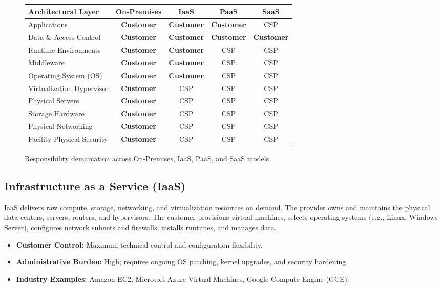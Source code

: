 \begin{figure}[htbp]
\centering
\small
\begin{tcolorbox}[colback=blue!5!white,colframe=blue!75!black,title=\textbf{The Cloud Service Model Abstraction Stack}]
\begin{center}
\setlength{\tabcolsep}{4.5pt}\begin{tabularx}{\linewidth}{|X|c|c|c|c|}
\hline
\textbf{Architectural Layer} & \textbf{On-Premises} & \textbf{IaaS} & \textbf{PaaS} & \textbf{SaaS} \\
\hline
Applications & \textbf{Customer} & \textbf{Customer} & \textbf{Customer} & CSP \\
Data \& Access Control & \textbf{Customer} & \textbf{Customer} & \textbf{Customer} & \textbf{Customer} \\
Runtime Environments & \textbf{Customer} & \textbf{Customer} & CSP & CSP \\
Middleware & \textbf{Customer} & \textbf{Customer} & CSP & CSP \\
Operating System (OS) & \textbf{Customer} & \textbf{Customer} & CSP & CSP \\
Virtualization Hypervisor & \textbf{Customer} & CSP & CSP & CSP \\
Physical Servers & \textbf{Customer} & CSP & CSP & CSP \\
Storage Hardware & \textbf{Customer} & CSP & CSP & CSP \\
Physical Networking & \textbf{Customer} & CSP & CSP & CSP \\
Facility Physical Security & \textbf{Customer} & CSP & CSP & CSP \\
\hline
\end{tabularx}
\end{center}
\end{tcolorbox}
\caption{Responsibility demarcation across On-Premises, IaaS, PaaS, and SaaS models.}
\label{fig:service_model_stack}
\end{figure}

\subsection{Infrastructure as a Service (IaaS)}
IaaS delivers raw compute, storage, networking, and virtualization resources on demand. The provider owns and maintains the physical data centers, servers, routers, and hypervisors. The customer provisions virtual machines, selects operating systems (e.g., Linux, Windows Server), configures network subnets and firewalls, installs runtimes, and manages data.
\begin{itemize}
    \item \textbf{Customer Control:} Maximum technical control and configuration flexibility.
    \item \textbf{Administrative Burden:} High; requires ongoing OS patching, kernel upgrades, and security hardening.
    \item \textbf{Industry Examples:} Amazon EC2, Microsoft Azure Virtual Machines, Google Compute Engine (GCE).
\end{itemize}

